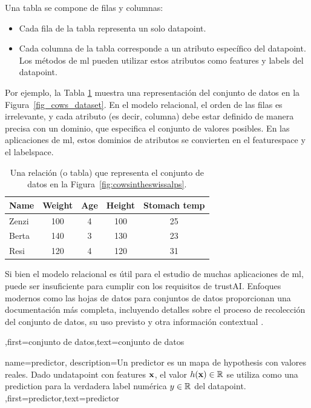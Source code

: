 {{	   Una tabla se compone de filas y columnas:
		\begin{itemize} 
		\item Cada fila de la tabla representa un solo \gls{datapoint}.
		\item Cada columna de la tabla corresponde a un atributo específico del \gls{datapoint}. 
		Los métodos de \gls{ml}  pueden utilizar estos atributos como \gls{feature}s y \gls{label}s del \gls{datapoint}.
		\end{itemize}
		Por ejemplo, la Tabla \ref{tab:cowdata} muestra una representación del conjunto de datos en la Figura\ \ref{fig_cows_dataset}. 
		En el modelo relacional, el orden de las filas es irrelevante, y cada atributo (es decir, columna) debe estar definido de manera precisa con un dominio, que especifica el conjunto de valores posibles.
		En las aplicaciones de \gls{ml}, estos dominios de atributos se convierten en el \gls{featurespace} y el \gls{labelspace}. 
		\begin{table}[H]
			\centering
			\begin{tabular}{lcccc}
				\hline
				\textbf{Name} & \textbf{Weight} & \textbf{Age} & \textbf{Height} & \textbf{Stomach temp} \\
				\hline
				Zenzi & 100 & 4 & 100 & 25 \\
				Berta & 140 & 3 & 130 & 23 \\
				Resi  & 120 & 4 & 120 & 31 \\
				\hline
			\end{tabular}
			\caption{Una relación (o tabla) que representa el conjunto de datos en la Figura\ \ref{fig:cowsintheswissalps}.}
			\label{tab:cowdata}
		\end{table}
 Si bien el modelo relacional es útil para el estudio de muchas aplicaciones de  \gls{ml}, puede ser insuficiente 
 para cumplir con los requisitos de  \gls{trustAI}. Enfoques modernos como las hojas de datos para conjuntos de datos proporcionan una documentación más completa,   
 incluyendo detalles sobre el proceso de recolección del conjunto de datos, su uso previsto y otra información contextual 
 \cite{DatasheetData2021}.},first={conjunto de datos},text={conjunto de datos}  
}

{name={predictor},
	description={Un predictor es un mapa de \gls{hypothesis} con valores reales.
		Dado un\gls{datapoint} con \gls{feature}s ${\bf x}$, el valor 
		$h({\bf x}) \in \mathbb{R}$ se utiliza como una \gls{prediction} para la verdadera  
		\gls{label} numérica $y \in \mathbb{R}$ del \gls{datapoint}. },first={predictor},text={predictor}  
}

